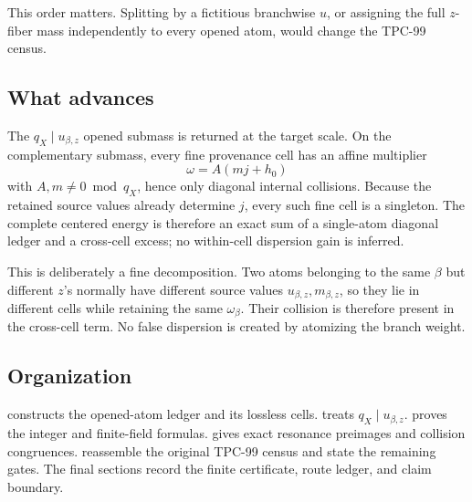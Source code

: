 This order matters.  Splitting by a fictitious branchwise \(u\), or
assigning the full \(z\)-fiber mass independently to every opened
atom, would change the TPC-99 census.

\subsection{What advances}

The \(q_X\mid u_{\beta,z}\) opened submass is returned at the target
scale.  On the complementary submass, every fine provenance cell
has an affine multiplier
\[
 \omega=A(mj+h_0)
\]
with \(A,m\ne0\bmod q_X\), hence only diagonal internal collisions.
Because the retained source values already determine \(j\), every
such fine cell is a singleton.  The complete centered energy is
therefore an exact sum of a single-atom diagonal ledger and a
cross-cell excess; no within-cell dispersion gain is inferred.

This is deliberately a fine decomposition.  Two atoms belonging to
the same \(\beta\) but different \(z\)'s normally have different
source values \(u_{\beta,z},m_{\beta,z}\), so they lie in different
cells while retaining the same \(\omega_\beta\).  Their collision is
therefore present in the cross-cell term.  No false dispersion is
created by atomizing the branch weight.

\subsection{Organization}

 constructs the opened-atom ledger and its
lossless cells.   treats
\(q_X\mid u_{\beta,z}\).   proves the
integer and finite-field formulas.   gives exact
resonance preimages and collision congruences.
 reassemble the
original TPC-99 census and state the remaining gates.  The final
sections record the finite certificate, route ledger, and claim
boundary.
